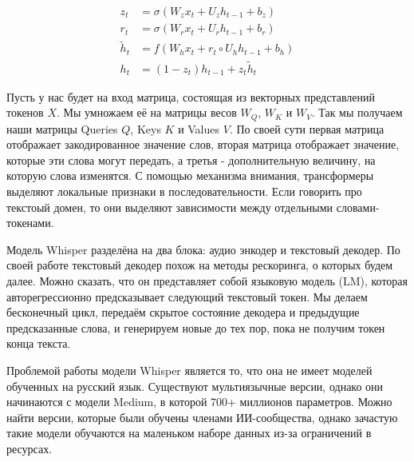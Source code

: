 \begin{equation}
  \begin{aligned}
    z_t &= \sigma(W_z x_t + U_z h_{t-1} + b_z) \\
    r_t &= \sigma(W_r x_t + U_r h_{t-1} + b_r) \\
    \tilde{h}_t &= f(W_h x_t + r_t \circ U_h h_{t-1} + b_h) \\
    h_t &= (1 - z_t) h_{t-1} + z_t \tilde{h}_t
  \end{aligned}
  \label{eq:qkv}
\end{equation}

Пусть у нас будет на вход матрица, состоящая из векторных представлений токенов $X$.
Мы умножаем её на матрицы весов $W_Q$, $W_K$ и $W_V$.
Так мы получаем наши матрицы Queries $Q$, Keys $K$ и Values $V$.
По своей сути первая матрица отображает закодированное значение слов, вторая матрица отображает значение, которые эти слова могут передать, а третья - дополнительную величину, на которую слова изменятся.
С помощью механизма внимания, трансформеры выделяют локальные признаки в последовательности.
Если говорить про текстоый домен, то они выделяют зависимости между отдельными словами-токенами.

Модель Whisper разделёна на два блока: аудио энкодер и текстовый декодер.
По своей работе текстовый декодер похож на методы рескоринга, о которых будем далее.
Можно сказать, что он представляет собой языковую модель (LM), которая авторегрессионно предсказывает следующий текстовый токен.
Мы делаем бесконечный цикл, передаём скрытое состояние декодера и предыдущие предсказанные слова, и генерируем новые до тех пор, пока не получим токен конца текста.

Проблемой работы модели Whisper является то, что она не имеет моделей обученных на русский язык.
Существуют мультиязычные версии, однако они начинаются с модели Medium, в которой 700+ миллионов параметров.
Можно найти версии, которые были обучены членами ИИ-сообщества, однако зачастую такие модели обучаются на маленьком наборе данных из-за ограничений в ресурсах.

